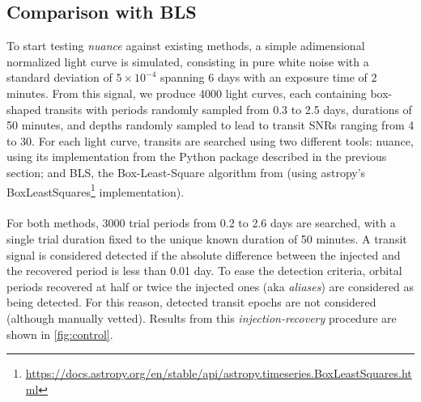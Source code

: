\documentclass[modern]{aastex631}
\newcommand{\nuancemethod}{\textit{nuance}}
\newcommand{\footlink}[1]{\footnote{\url{#1}}}
\begin{document}
\subsection{Comparison with BLS}\label{control}

To start testing \nuancemethod{} against existing methods, a simple adimensional normalized light curve is simulated, consisting in pure white noise with a standard deviation of $5\times 10^{-4}$ spanning 6 days with an exposure time of 2 minutes.
From this signal, we produce 4000 light curves, each containing box-shaped transits with periods randomly sampled from 0.3 to 2.5 days, durations of 50 minutes, and depths randomly sampled to lead to transit SNRs ranging from 4 to 30.
For each light curve, transits are searched using two different tools: \textsf{nuance}, using its implementation from the Python package described in the previous section; and BLS, the Box-Least-Square algorithm from \cite{bls} (using \textsf{astropy}'s \textsf{BoxLeastSquares}\footlink{https://docs.astropy.org/en/stable/api/astropy.timeseries.BoxLeastSquares.html} implementation).\\\\
For both methods, 3000 trial periods from 0.2 to 2.6 days are searched, with a single trial duration fixed to the unique known duration of 50 minutes. A transit signal is considered detected if the absolute difference between the injected and the recovered period is less than 0.01 day. To ease the detection criteria, orbital periods recovered at half or twice the injected ones (aka \textit{aliases}) are considered as being detected. For this reason, detected transit epochs are not considered (although manually vetted). Results from this \textit{injection-recovery} procedure are shown in \autoref{fig:control}.
\end{document}
